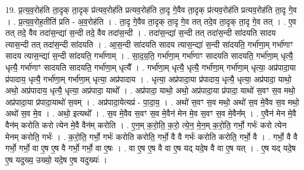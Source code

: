 \documentclass[17pt]{extarticle}
\begin{document}
19. प्र॒त्य॒व॒रोह॑ति ता॒दृक् ता॒दृक् प्र॑त्यव॒रोह॑ति प्रत्यव॒रोह॑ति ता॒दृ गे॒वैव ता॒दृक् प्र॑त्यव॒रोह॑ति प्रत्यव॒रोह॑ति ता॒दृ गे॒व । . प्र॒त्य॒व॒रोह॒तीति॑ प्रति - अ॒व॒रोह॑ति । . ता॒दृ गे॒वैव ता॒दृक् ता॒दृ गे॒व तत् तदे॒व ता॒दृक् ता॒दृ गे॒व तत् । . ए॒व तत् तदे॒ वैव तदा॑स॒न्द्या॑ स॒न्दी तदे॒ वैव तदा॑स॒न्दी । . तदा॑स॒न्द्या॑ स॒न्दी तत् तदा॑स॒न्दी सा॑दयति सादय त्यास॒न्दी तत् तदा॑स॒न्दी सा॑दयति । . आ॒स॒न्दी सा॑दयति सादय त्यास॒न्द्या॑ स॒न्दी सा॑दयति॒ गर्भा॑णा॒म् गर्भा॑णाꣳ सादय त्यास॒न्द्या॑ स॒न्दी सा॑दयति॒ गर्भा॑णाम् । . सा॒द॒य॒ति॒ गर्भा॑णा॒म् गर्भा॑णाꣳ सादयति सादयति॒ गर्भा॑णा॒म् धृत्यै॒ धृत्यै॒ गर्भा॑णाꣳ सादयति सादयति॒ गर्भा॑णा॒म् धृत्यै᳚ । . गर्भा॑णा॒म् धृत्यै॒ धृत्यै॒ गर्भा॑णा॒म् गर्भा॑णा॒म् धृत्या॒ अप्र॑पादा॒या प्र॑पादाय॒ धृत्यै॒ गर्भा॑णा॒म् गर्भा॑णा॒म् धृत्या॒ अप्र॑पादाय । . धृत्या॒ अप्र॑पादा॒या प्र॑पादाय॒ धृत्यै॒ धृत्या॒ अप्र॑पादा॒ याथो॒ अथो॒ अप्र॑पादाय॒ धृत्यै॒ धृत्या॒ अप्र॑पादा॒ याथो᳚ । . अप्र॑पादा॒ याथो॒ अथो॒ अप्र॑पादा॒या प्र॑पादा॒ याथो॑ स॒वꣳ स॒व मथो॒ अप्र॑पादा॒या प्र॑पादा॒याथो॑ स॒वम् । . अप्र॑पादा॒येत्यप्र॑ - पा॒दा॒य॒ । . अथो॑ स॒वꣳ स॒व मथो॒ अथो॑ स॒व मे॒वैव स॒व मथो॒ अथो॑ स॒व मे॒व । . अथो॒ इत्यथो᳚ । . स॒व मे॒वैव स॒वꣳ स॒व मे॒वैन॑ मेन मे॒व स॒वꣳ स॒व मे॒वैन᳚म् । . ए॒वैन॑ मेन मे॒वै वैन॑म् करोति करो त्येन मे॒वै वैन॑म् करोति । . ए॒न॒म् क॒रो॒ति॒ क॒रो॒ त्ये॒न॒ मे॒न॒म् क॒रो॒ति॒ गर्भो॒ गर्भः॑ करो त्येन मेनम् करोति॒ गर्भः॑ । . क॒रो॒ति॒ गर्भो॒ गर्भः॑ करोति करोति॒ गर्भो॒ वै वै गर्भः॑ करोति करोति॒ गर्भो॒ वै । . गर्भो॒ वै वै गर्भो॒ गर्भो॒ वा ए॒ष ए॒ष वै गर्भो॒ गर्भो॒ वा ए॒षः । . वा ए॒ष ए॒ष वै वा ए॒ष यद् यदे॒ष वै वा ए॒ष यत् । . ए॒ष यद् यदे॒ष ए॒ष यदुख्य॒ उख्यो॒ यदे॒ष ए॒ष यदुख्यः॑ । \newline
\end{document}
